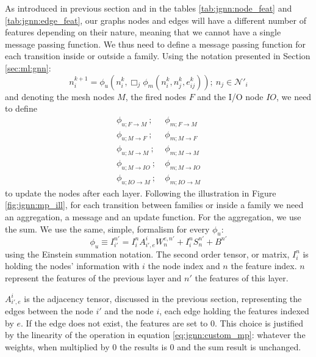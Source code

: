 \documentclass[../main.tex]{subfiles}
\begin{document}
As introduced in previous section and in the tables \ref{tab:jgnn:node_feat} and \ref{tab:jgnn:edge_feat}, our graphs nodes and edges will have a different number of features depending on their nature, meaning that we cannot have a single message passing function. We thus need to define a message passing function for each transition inside or outside a family. Using the notation presented in Section \ref{sec:ml:gnn}:
\begin{equation}
  \label{eq:jgnn:gen_mp}
  n_i^{k+1} = \phi_u (n_i^k, \Box_j \phi_m(n_i^k, n_j^k, e^k_{ij})); ~ n_j \in \mathcal{N}'_i
\end{equation}
and denoting the mesh nodes $M$, the fired nodes $F$ and the I/O node $IO$, we need to define
\begin{align*}
  \phi_{u; F\rightarrow M}  ~;~ &\phi_{m; F\rightarrow M} \\
  \phi_{u; M\rightarrow F}  ~;~ &\phi_{m; M\rightarrow F} \\
  \phi_{u; M\rightarrow M}  ~;~ &\phi_{m; M\rightarrow M} \\
  \phi_{u; M\rightarrow IO} ~;~ &\phi_{m; M\rightarrow IO} \\
  \phi_{u; IO\rightarrow M} ~;~ &\phi_{m; IO\rightarrow M}
\end{align*}
to update the nodes after each layer. Following the illustration in Figure \ref{fig:jgnn:mp_ill}, for each transition between families or inside a family we need an aggregation, a message and an update function. For the aggregation, we use the sum. We use the same, simple, formalism for every $\phi_u$:
\begin{equation}
  \label{eq:jgnn:custom_mp}
  \phi_u \equiv I^{n'}_{i'} = I^n_i A_{i',e}^{i} W_n^{e,n'} + I^n_i S^{n'}_{n} + B^{n'}
\end{equation}
using the Einstein summation notation. The second order tensor, or matrix, $I^{n}_i$ is holding the nodes' information with $i$ the node index and $n$ the feature index. $n$ represent the features of the previous layer and $n'$ the features of this layer.

$A_{i',e}^{i}$ is the adjacency tensor, discussed in the previous section, representing the edges between the node $i'$ and the node $i$, each edge holding the features indexed by $e$. If the edge does not exist, the features are set to 0. This choice is justified by the linearity of the operation in equation \ref{eq:jgnn:custom_mp}: whatever the weights, when multiplied by 0 the results is 0 and the sum result is unchanged.
\end{document}
